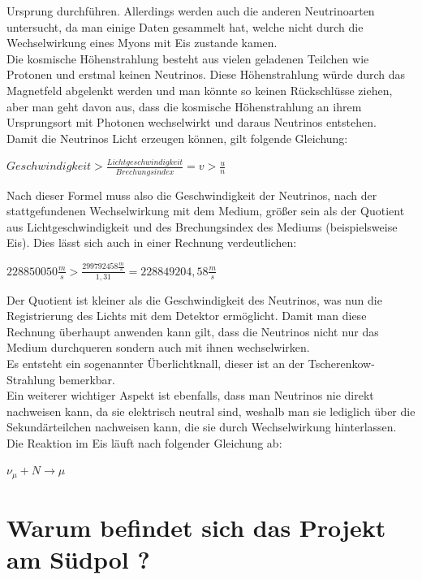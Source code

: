     Ursprung durchführen. Allerdings werden auch die anderen Neutrinoarten untersucht, da man einige Daten 
    gesammelt hat, welche nicht durch die Wechselwirkung eines Myons mit Eis zustande kamen. \\
    Die kosmische Höhenstrahlung besteht aus vielen geladenen Teilchen wie Protonen und erstmal keinen 
    Neutrinos. Diese Höhenstrahlung würde durch das Magnetfeld abgelenkt werden und man könnte so keinen 
    Rückschlüsse ziehen, aber man geht davon aus, dass die kosmische Höhenstrahlung an ihrem Ursprungsort 
    mit Photonen wechselwirkt und daraus Neutrinos entstehen. \\
    Damit die Neutrinos Licht erzeugen können, gilt folgende Gleichung:
    \begin{center}
        $Geschwindigkeit>\frac{Lichtgeschwindigkeit}{Brechungsindex} = v >\frac{u}{n}$
    \end{center}
    Nach dieser Formel muss also die Geschwindigkeit der Neutrinos, nach der stattgefundenen 
    Wechselwirkung mit dem Medium, größer sein als der Quotient aus Lichtgeschwindigkeit und des 
    Brechungsindex des Mediums (beispielsweise Eis). Dies lässt sich auch in einer Rechnung verdeutlichen:
    \begin{center}
        $228850050\frac{m}{s}>\frac{299792458\frac{m}{s}}{1,31}=228849204,58\frac{m}{s}$
    \end{center}
    Der Quotient ist kleiner als die Geschwindigkeit des Neutrinos, was nun die Registrierung des 
    Lichts mit dem Detektor ermöglicht. Damit man diese Rechnung überhaupt anwenden kann gilt, 
    dass die Neutrinos nicht nur das Medium durchqueren sondern auch mit ihnen wechselwirken. \\
    Es entsteht ein sogenannter \grqq Überlichtknall\grqq{}, dieser ist an der Tscherenkow-Strahlung bemerkbar. \\
    Ein weiterer wichtiger Aspekt ist ebenfalls, dass man Neutrinos nie direkt nachweisen kann, 
    da sie elektrisch neutral sind, weshalb man sie lediglich über die Sekundärteilchen nachweisen kann, 
    die sie durch Wechselwirkung hinterlassen. \cite{IcePhyCos13} \cite{SdW16} \cite{WdP13}\\
    Die Reaktion im Eis läuft nach folgender Gleichung ab:
    \begin{center}
        $\nu_\mu+N\rightarrow\mu$
    \end{center}

    \section{Warum befindet sich das Projekt am Südpol ?}
    
